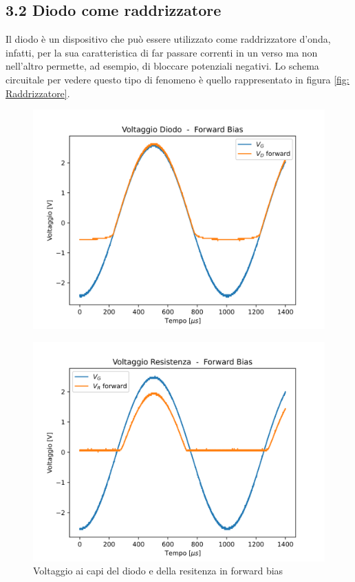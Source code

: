 \subsection{3.2 Diodo come raddrizzatore}
Il diodo è un dispositivo che può essere utilizzato come raddrizzatore d'onda, infatti, per la sua caratteristica di far passare correnti in un verso ma non nell'altro permette, ad esempio, di bloccare potenziali negativi. Lo schema circuitale per vedere questo tipo di fenomeno è quello rappresentato in figura \ref{fig: Raddrizzatore}.
\begin{figure}
    \centering
    \begin{minipage}{0.475\textwidth}
        \includegraphics[width=1\textwidth]{Diodo 3.2.(1-2)/V_D_forward.png}
    \label{3.2forwardbias}
    \end{minipage}
    \hfill
    \begin{minipage}{0.475\textwidth}
        \includegraphics[width=1\textwidth]{Diodo 3.2.(1-2)/V_R_forward.png}
    \end{minipage}
    \caption{Voltaggio ai capi del diodo e della resitenza in forward bias}
    \label{fig:raddrizzatore forward}
\end{figure}

